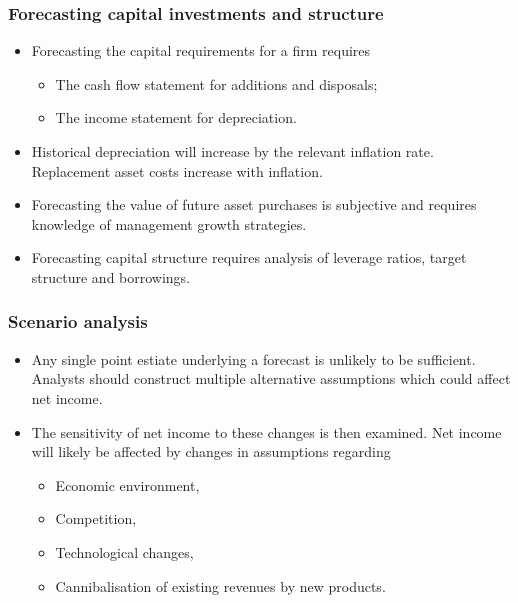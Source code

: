 \documentclass[../notes_compiled.tex]{subfiles}
\begin{document}
\subsubsection{Forecasting capital investments and structure}
\begin{itemize}
\item Forecasting the capital requirements for a firm requires
\begin{itemize}
\item The cash flow statement for additions and disposals;
\item The income statement for depreciation.
\end{itemize}
\item Historical depreciation will increase by the relevant inflation rate. Replacement asset costs increase with inflation.
\item Forecasting the value of future asset purchases is subjective and requires knowledge of management growth strategies.
\item Forecasting capital structure requires analysis of leverage ratios, target structure and borrowings.

\end{itemize}

\subsubsection{Scenario analysis}
\begin{itemize}
\item Any single point estiate underlying a forecast is unlikely to be sufficient. Analysts should construct multiple alternative assumptions which could affect net income.
\item The sensitivity of net income to these changes is then examined. Net income will likely be affected by changes in assumptions regarding
\begin{itemize}
\item Economic environment,
\item Competition,
\item Technological changes,
\item Cannibalisation of existing revenues by new products.
\end{itemize}
\end{itemize}
\end{document}
